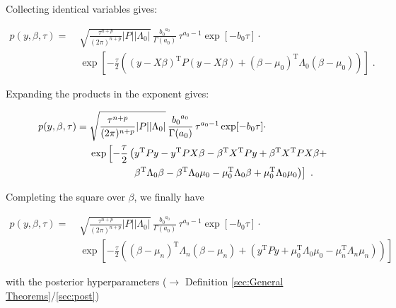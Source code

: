 \documentclass[a4paper,12pt,twoside]{book}
\begin{document}
Collecting identical variables gives:

\begin{equation} \label{eq:blr-post-GLM-NG-JL-s2}
\begin{split}
p(y,\beta,\tau) = \; & \sqrt{\frac{\tau^{n+p}}{(2 \pi)^{n+p}} |P| |\Lambda_0|} \, \frac{ {b_0}^{a_0}}{\Gamma(a_0)} \, \tau^{a_0-1} \exp[-b_0 \tau] \cdot \\
& \exp\left[ -\frac{\tau}{2} \left( (y-X\beta)^\mathrm{T} P (y-X\beta) + (\beta-\mu_0)^\mathrm{T} \Lambda_0 (\beta-\mu_0) \right) \right] \; .
\end{split}
\end{equation}

Expanding the products in the exponent gives:

\begin{equation} \label{eq:blr-post-GLM-NG-JL-s3}
\begin{split}
p(y,\beta,\tau) = \; & \sqrt{\frac{\tau^{n+p}}{(2 \pi)^{n+p}} |P| |\Lambda_0|} \, \frac{ {b_0}^{a_0}}{\Gamma(a_0)} \, \tau^{a_0-1} \exp[-b_0 \tau] \cdot \\
& \exp\left[ -\frac{\tau}{2} \left( y^\mathrm{T} P y - y^\mathrm{T} P X \beta - \beta^\mathrm{T} X^\mathrm{T} P y + \beta^\mathrm{T} X^\mathrm{T} P X \beta + \right. \right. \\
& \hphantom{\exp \left[ -\frac{\tau}{2} \right.} \; \left. \left. \beta^\mathrm{T} \Lambda_0 \beta - \beta^\mathrm{T} \Lambda_0 \mu_0 - \mu_0^\mathrm{T} \Lambda_0 \beta + \mu_0^\mathrm{T} \Lambda_0 \mu_0 \right) \right] \; .
\end{split}
\end{equation}

Completing the square over $\beta$, we finally have

\begin{equation} \label{eq:blr-post-GLM-NG-JL-s4}
\begin{split}
p(y,\beta,\tau) = \; & \sqrt{\frac{\tau^{n+p}}{(2 \pi)^{n+p}} |P| |\Lambda_0|} \, \frac{ {b_0}^{a_0}}{\Gamma(a_0)} \, \tau^{a_0-1} \exp[-b_0 \tau] \cdot \\
& \exp\left[ -\frac{\tau}{2} \left( (\beta-\mu_n)^\mathrm{T} \Lambda_n (\beta-\mu_n) + (y^\mathrm{T} P y + \mu_0^\mathrm{T} \Lambda_0 \mu_0 - \mu_n^\mathrm{T} \Lambda_n \mu_n) \right) \right]
\end{split}
\end{equation}

with the posterior hyperparameters ($\rightarrow$ Definition \ref{sec:General Theorems}/\ref{sec:post})
\end{document}
